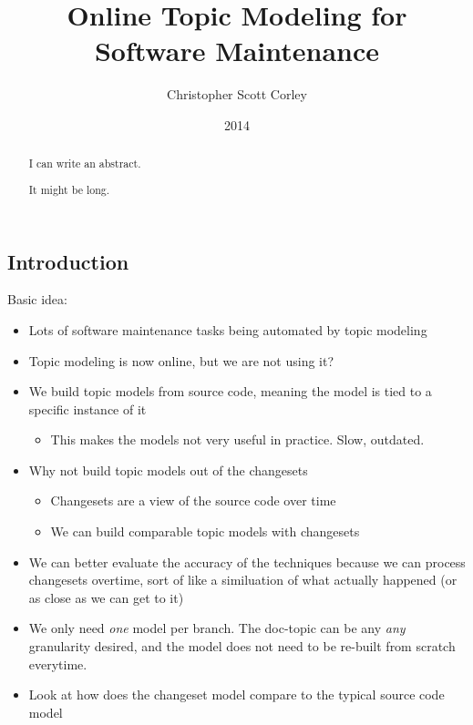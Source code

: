 \documentclass[12pt,draft]{Manuscript}
\title{Online Topic Modeling for Software Maintenance}
\author{Christopher Scott Corley}
\date{2014}
\begin{document}
\maketitle

\begin{abstract}
    I can write an abstract.
    
    It might be long.
\end{abstract}

{
\hypersetup{linkcolor=black}
\setcounter{tocdepth}{2}
\tableofcontents
}
\begin{abbreviations}
    
\end{abbreviations}
\listoftables
\listoffigures

\clearpage
\begin{body}
\chapter{Introduction}\label{introduction}

Basic idea:

\begin{itemize}
\itemsep1pt\parskip0pt
\item
  Lots of software maintenance tasks being automated by topic modeling
\item
  Topic modeling is now online, but we are not using it?
\item
  We build topic models from source code, meaning the model is tied to a
  specific instance of it

  \begin{itemize}
  \itemsep1pt\parskip0pt
  \item
    This makes the models not very useful in practice. Slow, outdated.
  \end{itemize}
\item
  Why not build topic models out of the changesets

  \begin{itemize}
  \itemsep1pt\parskip0pt
  \item
    Changesets are a view of the source code over time
  \item
    We can build comparable topic models with changesets
  \end{itemize}
\item
  We can better evaluate the accuracy of the techniques because we can
  process changesets overtime, sort of like a similuation of what
  actually happened (or as close as we can get to it)
\item
  We only need \emph{one} model per branch. The doc-topic can be any
  \emph{any} granularity desired, and the model does not need to be
  re-built from scratch everytime.
\item
  Look at how does the changeset model compare to the typical source
  code model


\end{itemize}
\end{body}
\end{document}
